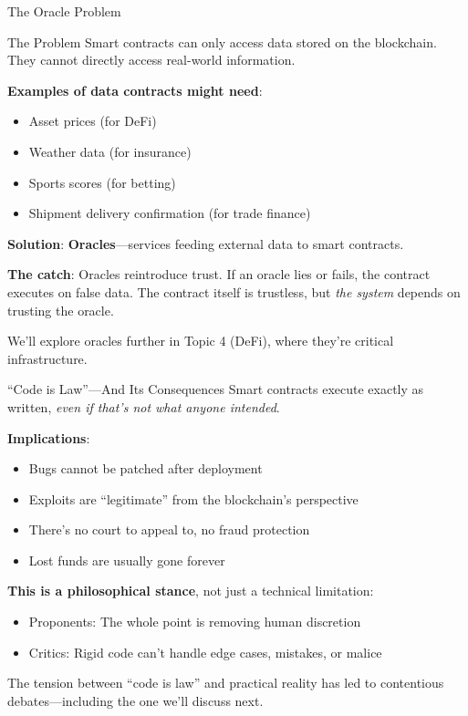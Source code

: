 \documentclass[10pt]{beamer}
\newcommand{\highlight}[1]{\textcolor{AccentOrange}{\textbf{#1}}}
\begin{document}
\begin{frame}{The Oracle Problem}
  \begin{block}{The Problem}
    Smart contracts can only access data stored on the blockchain. They cannot directly access real-world information.
  \end{block}
  
  \vspace{1em}
  \textbf{Examples of data contracts might need}:
  \begin{itemize}
    \item Asset prices (for DeFi)
    \item Weather data (for insurance)
    \item Sports scores (for betting)
    \item Shipment delivery confirmation (for trade finance)
  \end{itemize}
  
  \vspace{1em}
  \textbf{Solution}: \highlight{Oracles}---services feeding external data to smart contracts.
  
  \vspace{0.5em}
  \textbf{The catch}: Oracles reintroduce trust. If an oracle lies or fails, the contract executes on false data. The contract itself is trustless, but \textit{the system} depends on trusting the oracle.
  
  \vspace{0.5em}
  We'll explore oracles further in Topic 4 (DeFi), where they're critical infrastructure.
\end{frame}

\begin{frame}{``Code is Law''---And Its Consequences}
  Smart contracts execute exactly as written, \textit{even if that's not what anyone intended}.
  
  \vspace{1em}
  \textbf{Implications}:
  \begin{itemize}
    \item Bugs cannot be patched after deployment
    \item Exploits are ``legitimate'' from the blockchain's perspective
    \item There's no court to appeal to, no fraud protection
    \item Lost funds are usually gone forever
  \end{itemize}
  
  \vspace{1em}
  \textbf{This is a philosophical stance}, not just a technical limitation:
  \begin{itemize}
    \item Proponents: The whole point is removing human discretion
    \item Critics: Rigid code can't handle edge cases, mistakes, or malice
  \end{itemize}
  
  \vspace{1em}
  The tension between ``code is law'' and practical reality has led to contentious debates---including the one we'll discuss next.
\end{frame}
\end{document}

